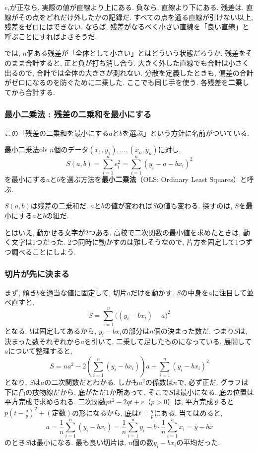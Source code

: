 $e_i$が正なら, 実際の値が直線より上にある.
負なら, 直線より下にある.
残差は, 直線がその点をどれだけ外したかの記録だ.
すべての点を通る直線が引けない以上, 残差をゼロにはできない.
ならば, 残差がなるべく小さい直線を「良い直線」と呼ぶことにすればよさそうだ.

では, $n$個ある残差が「全体として小さい」とはどういう状態だろうか.
残差をそのまま合計すると, 正と負が打ち消し合う.
大きく外した直線でも合計は小さく出るので, 合計では全体の大きさが測れない.
分散を定義したときも, 偏差の合計がゼロになるのを防ぐために二乗した.
ここでも同じ手を使う.
各残差を\textbf{二乗}してから合計する.

\subsubsection*{最小二乗法 : 残差の二乗和を最小にする}

この「残差の二乗和を最小にする$a$と$b$を選ぶ」という方針に名前がついている.

\begin{defi}{最小二乗法}{ols}
$n$個のデータ$(x_1, y_1), \ldots, (x_n, y_n)$に対し,
\[
  S(a, b) = \sum_{i=1}^{n} e_i^2 = \sum_{i=1}^{n} (y_i - a - bx_i)^2
\]
を最小にする$a$と$b$を選ぶ方法を\textbf{最小二乗法}（OLS: Ordinary Least Squares）と呼ぶ.
\end{defi}

$S(a, b)$は残差の二乗和だ.
$a$と$b$の値が変われば$S$の値も変わる.
探すのは, $S$を最小にする$a$と$b$の組だ.

とはいえ, 動かせる文字が2つある.
高校で二次関数の最小値を求めたときは, 動く文字は1つだった.
2つ同時に動かすのは難しそうなので, 片方を固定して1つずつ調べることにしよう.

\subsubsection*{切片が先に決まる}

まず, 傾き$b$を適当な値に固定して, 切片$a$だけを動かす.
$S$の中身を$a$に注目して並べ直すと,
\[
  S = \sum_{i=1}^{n} \bigl( (y_i - bx_i) - a \bigr)^2
\]
となる.
$b$は固定してあるから, $y_i - bx_i$の部分は$n$個の決まった数だ.
つまり$S$は, 決まった数それぞれから$a$を引いて, 二乗して足したものになっている.
展開して$a$について整理すると,
\[
  S = n a^2 - 2\left(\sum_{i=1}^{n}(y_i - bx_i)\right) a + \sum_{i=1}^{n}(y_i - bx_i)^2
\]
となり, $S$は$a$の二次関数だとわかる.
しかも$a^2$の係数は$n$で, 必ず正だ.
グラフは下に凸の放物線だから, 底がただ1か所あって, そこで$S$は最小になる.
底の位置は平方完成で求められる.
二次関数$pt^2 - 2qt + r$（$p > 0$）は, 平方完成すると$p\left(t - \frac{q}{p}\right)^2 + (\mbox{定数})$の形になるから, 底は$t = \frac{q}{p}$にある.
当てはめると,
\[
  a = \frac{1}{n}\sum_{i=1}^{n}(y_i - bx_i) = \frac{1}{n}\sum_{i=1}^{n}y_i - b \cdot \frac{1}{n}\sum_{i=1}^{n}x_i = \bar{y} - b\bar{x}
\]
のとき$S$は最小になる.
最も良い切片は, $n$個の数$y_i - bx_i$の平均だった.

